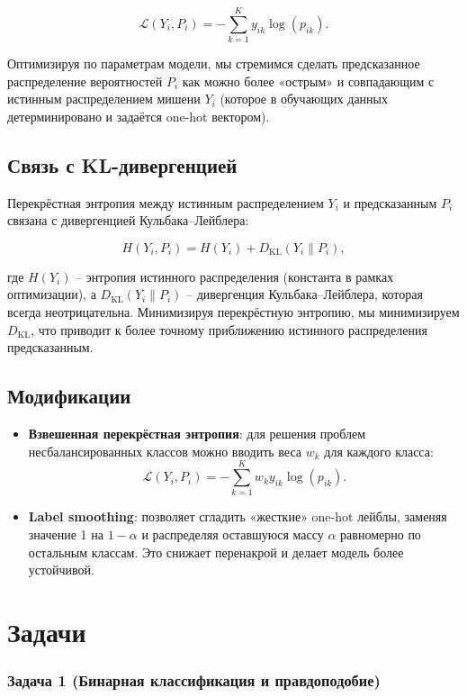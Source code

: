 $$
\mathcal{L}(Y_i, P_i) = -\sum_{k=1}^{K} y_{ik}\log(p_{ik}).
$$

Оптимизируя по параметрам модели, мы стремимся сделать предсказанное распределение вероятностей $P_i$ как можно более «острым» и совпадающим с истинным распределением мишени $Y_i$ (которое в обучающих данных детерминировано и задаётся one-hot вектором).

\subsection*{Связь с KL-дивергенцией}

Перекрёстная энтропия между истинным распределением $Y_i$ и предсказанным $P_i$ связана с дивергенцией Кульбака–Лейблера:

$$
H(Y_i, P_i) = H(Y_i) + D_{\text{KL}}(Y_i \| P_i),
$$

где $H(Y_i)$ – энтропия истинного распределения (константа в рамках оптимизации), а $D_{\text{KL}}(Y_i \| P_i)$ – дивергенция Кульбака–Лейблера, которая всегда неотрицательна. Минимизируя перекрёстную энтропию, мы минимизируем $D_{\text{KL}}$, что приводит к более точному приближению истинного распределения предсказанным.

\subsection*{Модификации}

\begin{itemize}
    \item \textbf{Взвешенная перекрёстная энтропия}: для решения проблем несбалансированных классов можно вводить веса $w_k$ для каждого класса:
    $$
    \mathcal{L}(Y_i, P_i) = -\sum_{k=1}^{K} w_k y_{ik}\log(p_{ik}).
    $$
    
    \item \textbf{Label smoothing}: позволяет сгладить «жесткие» one-hot лейблы, заменяя значение 1 на $1-\alpha$ и распределяя оставшуюся массу $\alpha$ равномерно по остальным классам. Это снижает перенакрой и делает модель более устойчивой.
\end{itemize}

\newpage

\section*{Задачи}

\subsubsection*{Задача 1 (Бинарная классификация и правдоподобие)}


